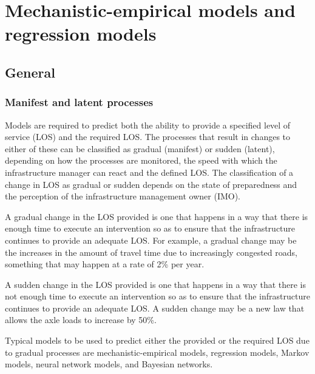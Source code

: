 %
%
%
\chapter{Mechanistic-empirical models and regression models }
\label{meempi} %
\section{General}
\subsection{Manifest and latent processes}
Models are required to predict both the ability to provide a specified level of service (LOS) and the required LOS. The processes that result in changes to either of these can be classified as gradual (manifest) or sudden (latent), depending on how the processes are monitored, the speed with which the infrastructure manager can react and the defined LOS. The classification of a change in LOS as gradual or sudden depends on the state of preparedness and the perception of the infrastructure management owner (IMO). 

A gradual change in the LOS provided is one that happens in a way that there is enough time to execute an intervention so as to ensure that the infrastructure continues to provide an adequate LOS. For example, a gradual change may be the increases in the amount of travel time due to increasingly congested roads, something that may happen at a rate of 2\% per year. 

A sudden change in the LOS provided is one that happens in a way that there is not enough time to execute an intervention so as to ensure that the infrastructure continues to provide an adequate LOS. A sudden change may be a new law that allows the axle loads to increase by 50\%. 

Typical models to be used to predict either the provided or the required LOS due to gradual processes are mechanistic-empirical models, regression models, Markov models, neural network models, and Bayesian networks. 

